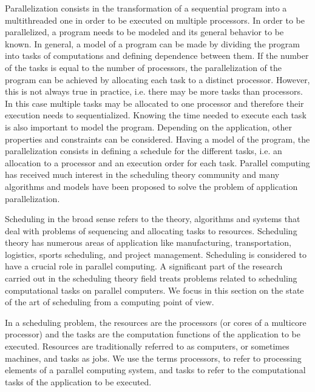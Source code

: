 Parallelization consists in the transformation of a sequential program into a multithreaded one in order to be executed on multiple processors. In order to be parallelized, a program needs to be modeled and its general behavior to be known. In general, a model of a program can be made by dividing the program into tasks of computations and defining dependence between them. 
If the number of the tasks is equal to the number of processors, the parallelization of the program can be achieved by allocating each task to a distinct processor. However, this is not always true in practice, i.e. there may be more tasks than processors. In this case multiple tasks may be allocated to one processor and therefore their execution needs to sequentialized.  
Knowing the time needed to execute each task is also important to model the program. Depending on the application, other properties and constraints can be considered. Having a model of the program, the parallelization consists in defining a schedule for the different tasks, i.e. an allocation to a processor and an execution order for each task. Parallel computing has received much interest in the scheduling theory community and many algorithms and models have been proposed to solve the problem of application parallelization.   

Scheduling in the broad sense refers to the theory, algorithms and systems that deal with problems of sequencing and allocating tasks to resources. Scheduling theory has numerous areas of application like manufacturing, transportation, logistics, sports scheduling, and project management. Scheduling is considered to have a crucial role in parallel computing. A significant part of the research carried out in the scheduling theory field treats problems related to scheduling computational tasks on parallel computers. We focus in this section on the state of the art of scheduling from a computing point of view.

In a scheduling problem, the resources are the processors (or cores of a multicore processor) and the tasks are the computation functions of the application to be executed. Resources are traditionally referred to as computers, or sometimes machines, and tasks as jobs. We use the terms processors, to refer to processing elements of a parallel computing system, and tasks to refer to the computational tasks of the application to be executed.

